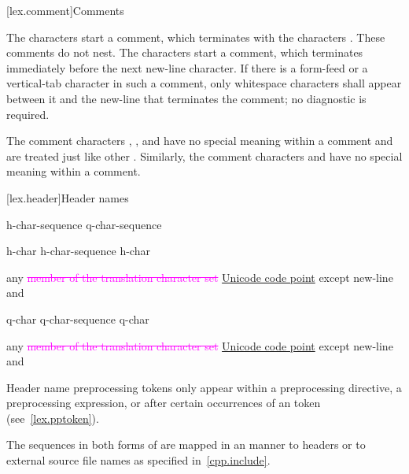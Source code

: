 \documentclass{wg21}
\newcommand{\addedTranslation}[1]{\textcolor{addclrTwo}{\uline{#1}}}
\newcommand{\removedTranslation}[1]{\textcolor{magenta}{\sout{#1}}}
\newcommand{\changedTranslation}[2]{\removedTranslation{#1} \addedTranslation{#2}}
\begin{document}
[lex.comment]{Comments}

\pnum
{}%
%
%
The characters \tcode{/*} start a comment, which terminates with the
characters \tcode{*/}. These comments do not nest.
%
The characters \tcode{//} start a comment, which terminates immediately before the
next new-line character. If there is a form-feed or a vertical-tab
character in such a comment, only whitespace characters shall appear
between it and the new-line that terminates the comment; no diagnostic
is required.
\begin{note}
    The comment characters \tcode{//}, \tcode{/*},
    and \tcode{*/} have no special meaning within a \tcode{//} comment and
    are treated just like other . Similarly, the comment
    characters \tcode{//} and \tcode{/*} have no special meaning within a
    \tcode{/*} comment.
\end{note}

[lex.header]{Header names}

%
\begin{bnf}
    \br
    \terminal{<} h-char-sequence \terminal{>}\br
     q-char-sequence 
\end{bnf}

\begin{bnf}
    \br
    h-char\br
    h-char-sequence h-char
\end{bnf}

\begin{bnf}
    \br
    \textnormal{any \changedTranslation{member of the translation character set}{Unicode code point} except new-line and }
\end{bnf}

\begin{bnf}
    \br
    q-char\br
    q-char-sequence q-char
\end{bnf}

\begin{bnf}
    \br
    \textnormal{any \changedTranslation{member of the translation character set}{Unicode code point} except new-line and }
\end{bnf}

\pnum
\begin{note}
    Header name preprocessing tokens only appear within
    a  preprocessing directive,
    a  preprocessing expression, or
    after certain occurrences of an  token
    (see~\ref{lex.pptoken}).
\end{note}
The sequences in both forms of  are mapped in an
 manner to headers or to
external source file names as specified in~\ref{cpp.include}.
\end{document}
